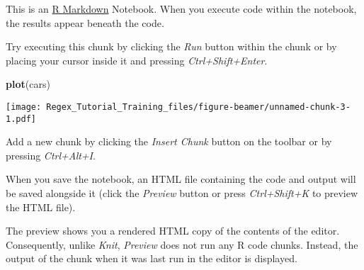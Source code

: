 \documentclass[ignorenonframetext,]{beamer}
\newenvironment{Shaded}{\begin{snugshade}}{\end{snugshade}}
\newcommand{\KeywordTok}[1]{\textcolor[rgb]{0.13,0.29,0.53}{\textbf{#1}}}
\newcommand{\NormalTok}[1]{#1}
\begin{document}
\begin{frame}[fragile]

This is an \href{http://rmarkdown.rstudio.com}{R Markdown} Notebook.
When you execute code within the notebook, the results appear beneath
the code.

Try executing this chunk by clicking the \emph{Run} button within the
chunk or by placing your cursor inside it and pressing
\emph{Ctrl+Shift+Enter}.

\begin{Shaded}
\begin{Highlighting}[]
\KeywordTok{plot}\NormalTok{(cars)}
\end{Highlighting}
\end{Shaded}

\texttt{[image: Regex\_Tutorial\_Training\_files/figure-beamer/unnamed-chunk-3-1.pdf]}

Add a new chunk by clicking the \emph{Insert Chunk} button on the
toolbar or by pressing \emph{Ctrl+Alt+I}.

When you save the notebook, an HTML file containing the code and output
will be saved alongside it (click the \emph{Preview} button or press
\emph{Ctrl+Shift+K} to preview the HTML file).

The preview shows you a rendered HTML copy of the contents of the
editor. Consequently, unlike \emph{Knit}, \emph{Preview} does not run
any R code chunks. Instead, the output of the chunk when it was last run
in the editor is displayed.

\end{frame}

\begin{frame}

\end{frame}
\end{document}
